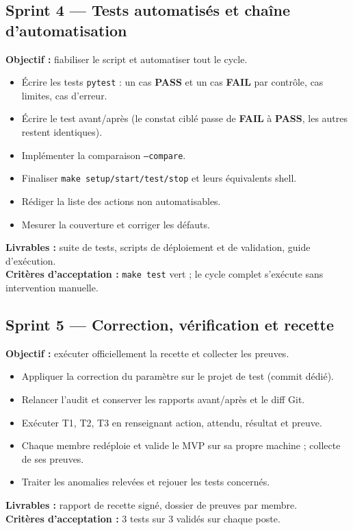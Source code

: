 \documentclass[11pt,a4paper]{article}
\newcommand{\code}[1]{{\NoAutoSpacing\texttt{\small #1}}}
\newcommand{\code}[1]{{\texttt{\small #1}}}
\newcommand{\PASS}{\textbf{\textcolor{vert}{PASS}}}
\newcommand{\FAIL}{\textbf{\textcolor{rouge}{FAIL}}}
\begin{document}
\subsection{Sprint 4 --- Tests automatisés et chaîne d'automatisation}
\textbf{Objectif :} fiabiliser le script et automatiser tout le cycle.
\begin{itemize}
  \item Écrire les tests \code{pytest} : un cas \PASS{} et un cas \FAIL{} par contrôle, cas limites, cas d'erreur.
  \item Écrire le test avant/après (le constat ciblé passe de \FAIL{} à \PASS{}, les autres restent identiques).
  \item Implémenter la comparaison \code{--compare}.
  \item Finaliser \code{make setup/start/test/stop} et leurs équivalents shell.
  \item Rédiger la liste des actions non automatisables.
  \item Mesurer la couverture et corriger les défauts.
\end{itemize}
\textbf{Livrables :} suite de tests, scripts de déploiement et de validation, guide d'exécution.\\
\textbf{Critères d'acceptation :} \code{make test} vert ; le cycle complet s'exécute sans intervention manuelle.

\subsection{Sprint 5 --- Correction, vérification et recette}
\textbf{Objectif :} exécuter officiellement la recette et collecter les preuves.
\begin{itemize}
  \item Appliquer la correction du paramètre sur le projet de test (commit dédié).
  \item Relancer l'audit et conserver les rapports avant/après et le diff Git.
  \item Exécuter T1, T2, T3 en renseignant action, attendu, résultat et preuve.
  \item Chaque membre redéploie et valide le MVP sur sa propre machine ; collecte de ses preuves.
  \item Traiter les anomalies relevées et rejouer les tests concernés.
\end{itemize}
\textbf{Livrables :} rapport de recette signé, dossier de preuves par membre.\\
\textbf{Critères d'acceptation :} 3 tests sur 3 validés sur chaque poste.
\end{document}
